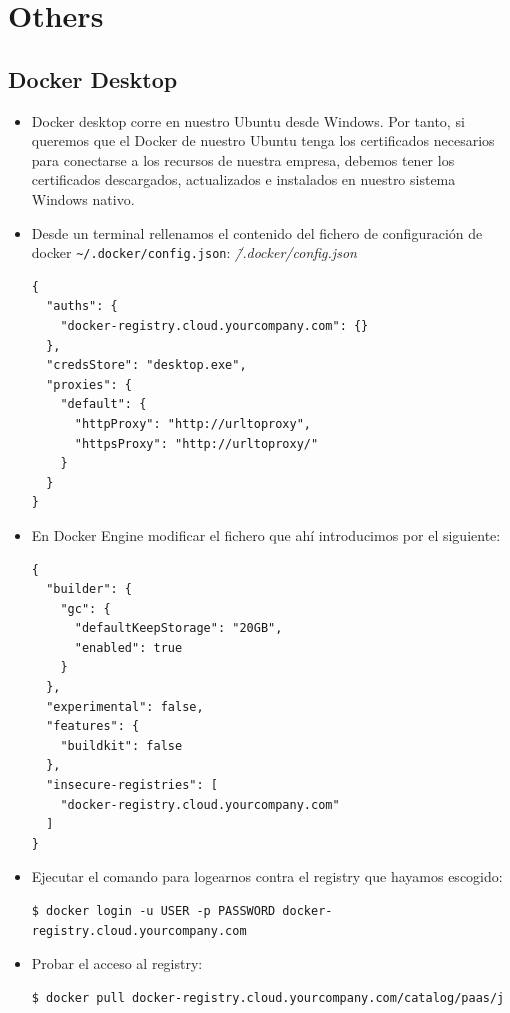 \documentclass{article}
\newenvironment{codetemplate}[1][]{%
  \mybasecolorbox[#1]
  \itshape
}{%
  \endmybasecolorbox
}
\begin{document}
\newpage
\section{Others}

\subsection{Docker Desktop}

\begin{itemize}
    \item Docker desktop corre en nuestro Ubuntu desde Windows. Por tanto, si queremos que el Docker de nuestro Ubuntu tenga los certificados necesarios para conectarse a los recursos de nuestra empresa, debemos tener los certificados descargados, actualizados e instalados en nuestro sistema Windows nativo.
    \item Desde un terminal rellenamos el contenido del fichero de configuración de docker \verb|~/.docker/config.json|:
\begin{codetemplate}{\~/.docker/config.json}
\begin{verbatim}
{
  "auths": {
    "docker-registry.cloud.yourcompany.com": {}
  },
  "credsStore": "desktop.exe",
  "proxies": {
    "default": {
      "httpProxy": "http://urltoproxy",
      "httpsProxy": "http://urltoproxy/"
    }
  }
}
\end{verbatim}
\end{codetemplate}

    \item En Docker Engine modificar el fichero que ahí introducimos por el siguiente:
\begin{codetemplate}{}
\begin{verbatim}
{
  "builder": {
    "gc": {
      "defaultKeepStorage": "20GB",
      "enabled": true
    }
  },
  "experimental": false,
  "features": {
    "buildkit": false
  },
  "insecure-registries": [
    "docker-registry.cloud.yourcompany.com"
  ]
}
\end{verbatim}
\end{codetemplate}

    \item Ejecutar el comando para logearnos contra el registry que hayamos escogido:
\begin{codetemplate}{}
\begin{verbatim}
$ docker login -u USER -p PASSWORD docker-registry.cloud.yourcompany.com
\end{verbatim}
\end{codetemplate}

    \item Probar el acceso al registry:
\begin{codetemplate}{}
\begin{verbatim}
$ docker pull docker-registry.cloud.yourcompany.com/catalog/paas/j
\end{verbatim}
\end{codetemplate} 
\end{itemize}
\end{document}
